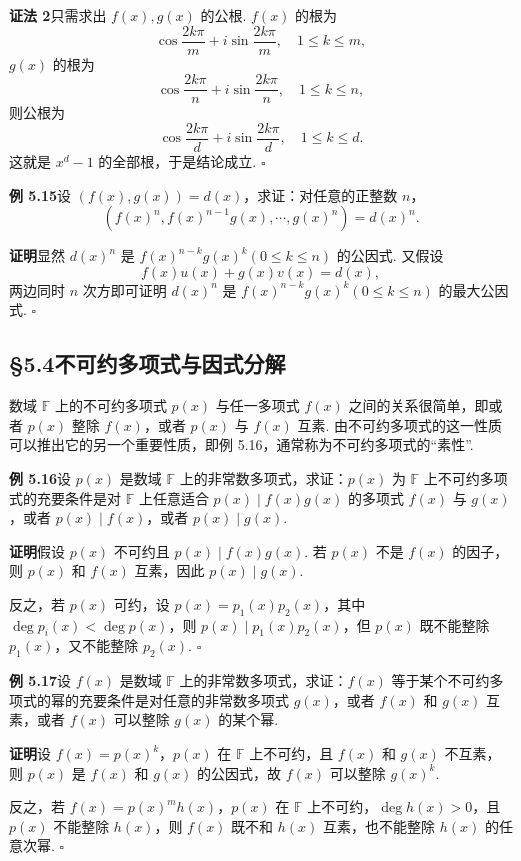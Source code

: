 \documentclass[UTF8,12pt,a4paper,fontset=fandol]{ctexart}
\begin{document}
\noindent\textbf{证法 2}\quad 只需求出 $f(x),g(x)$ 的公根. $f(x)$ 的根为
\[
\cos\frac{2k\pi}{m}+i\sin\frac{2k\pi}{m},\quad 1\le k\le m,
\]
$g(x)$ 的根为
\[
\cos\frac{2k\pi}{n}+i\sin\frac{2k\pi}{n},\quad 1\le k\le n,
\]
则公根为
\[
\cos\frac{2k\pi}{d}+i\sin\frac{2k\pi}{d},\quad 1\le k\le d.
\]
这就是 $x^d-1$ 的全部根，于是结论成立. \hfill $\square$

\noindent\textbf{例 5.15}\quad 设 $(f(x),g(x))=d(x)$，求证：对任意的正整数 $n$，
\[
(f(x)^n,f(x)^{n-1}g(x),\cdots,g(x)^n)=d(x)^n.
\]

\noindent\textbf{证明}\quad 显然 $d(x)^n$ 是 $f(x)^{n-k}g(x)^k(0\le k\le n)$ 的公因式. 又假设
\[
f(x)u(x)+g(x)v(x)=d(x),
\]
两边同时 $n$ 次方即可证明 $d(x)^n$ 是 $f(x)^{n-k}g(x)^k(0\le k\le n)$ 的最大公因式. \hfill $\square$

\subsection*{§5.4\quad 不可约多项式与因式分解}

数域 $\mathbb{F}$ 上的不可约多项式 $p(x)$ 与任一多项式 $f(x)$ 之间的关系很简单，即或者 $p(x)$ 整除 $f(x)$，或者 $p(x)$ 与 $f(x)$ 互素. 由不可约多项式的这一性质可以推出它的另一个重要性质，即例 5.16，通常称为不可约多项式的``素性''.

\noindent\textbf{例 5.16}\quad 设 $p(x)$ 是数域 $\mathbb{F}$ 上的非常数多项式，求证：$p(x)$ 为 $\mathbb{F}$ 上不可约多项式的充要条件是对 $\mathbb{F}$ 上任意适合 $p(x)\mid f(x)g(x)$ 的多项式 $f(x)$ 与 $g(x)$，或者 $p(x)\mid f(x)$，或者 $p(x)\mid g(x)$.

\noindent\textbf{证明}\quad 假设 $p(x)$ 不可约且 $p(x)\mid f(x)g(x)$. 若 $p(x)$ 不是 $f(x)$ 的因子，则 $p(x)$ 和 $f(x)$ 互素，因此 $p(x)\mid g(x)$.

反之，若 $p(x)$ 可约，设 $p(x)=p_1(x)p_2(x)$，其中 $\deg p_i(x)<\deg p(x)$，则 $p(x)\mid p_1(x)p_2(x)$，但 $p(x)$ 既不能整除 $p_1(x)$，又不能整除 $p_2(x)$. \hfill $\square$

\noindent\textbf{例 5.17}\quad 设 $f(x)$ 是数域 $\mathbb{F}$ 上的非常数多项式，求证：$f(x)$ 等于某个不可约多项式的幂的充要条件是对任意的非常数多项式 $g(x)$，或者 $f(x)$ 和 $g(x)$ 互素，或者 $f(x)$ 可以整除 $g(x)$ 的某个幂.

\noindent\textbf{证明}\quad 设 $f(x)=p(x)^k$，$p(x)$ 在 $\mathbb{F}$ 上不可约，且 $f(x)$ 和 $g(x)$ 不互素，则 $p(x)$ 是 $f(x)$ 和 $g(x)$ 的公因式，故 $f(x)$ 可以整除 $g(x)^k$.

反之，若 $f(x)=p(x)^m h(x)$，$p(x)$ 在 $\mathbb{F}$ 上不可约，$\deg h(x)>0$，且 $p(x)$ 不能整除 $h(x)$，则 $f(x)$ 既不和 $h(x)$ 互素，也不能整除 $h(x)$ 的任意次幂. \hfill $\square$
\end{document}
